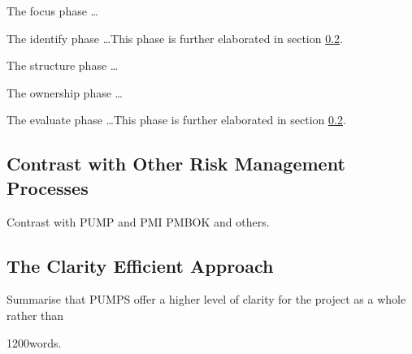 The focus phase \dots

The identify phase \dots This phase is further elaborated in section \ref{}.

The structure phase \dots

The ownership phase \dots

The evaluate phase \dots This phase is further elaborated in section \ref{}.

\subsection{Contrast with Other Risk Management Processes}
Contrast with PUMP and PMI PMBOK and others.

\subsection{The Clarity Efficient Approach}
Summarise that PUMPS offer a higher level of clarity for the project as a whole rather than 


1200words.